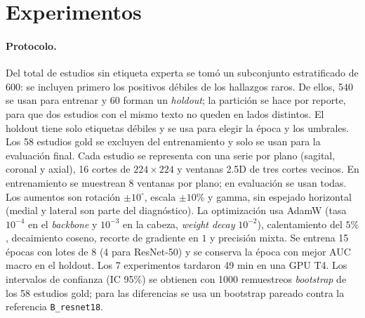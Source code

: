 
\section{Experimentos}
\label{sec:experimentos}

\paragraph{Protocolo.}
Del total de estudios sin etiqueta experta se tomó un subconjunto estratificado de 600: se incluyen primero los positivos débiles de los hallazgos raros.
De ellos, 540 se usan para entrenar y 60 forman un \emph{holdout}; la partición se hace por reporte, para que dos estudios con el mismo texto no queden en lados distintos.
El holdout tiene solo etiquetas débiles y se usa para elegir la época y los umbrales.
Los 58 estudios gold se excluyen del entrenamiento y solo se usan para la evaluación final.
Cada estudio se representa con una serie por plano (sagital, coronal y axial), 16 cortes de $224\times224$ y ventanas 2.5D de tres cortes vecinos.
En entrenamiento se muestrean 8 ventanas por plano; en evaluación se usan todas.
Los aumentos son rotación $\pm10^\circ$, escala $\pm10\%$ y gamma, sin espejado horizontal (medial y lateral son parte del diagnóstico).
La optimización usa AdamW (tasa $10^{-4}$ en el \emph{backbone} y $10^{-3}$ en la cabeza, \emph{weight decay} $10^{-2}$), calentamiento del $5\%$, decaimiento coseno, recorte de gradiente en $1$ y precisión mixta.
Se entrena 15 épocas con lotes de 8 (4 para ResNet-50) y se conserva la época con mejor AUC macro en el holdout.
Los 7 experimentos tardaron 49 min en una GPU T4.
Los intervalos de confianza (IC 95\%) se obtienen con 1000 remuestreos \emph{bootstrap} de los 58 estudios gold; para las diferencias se usa un bootstrap pareado contra la referencia \texttt{B\_resnet18}.

